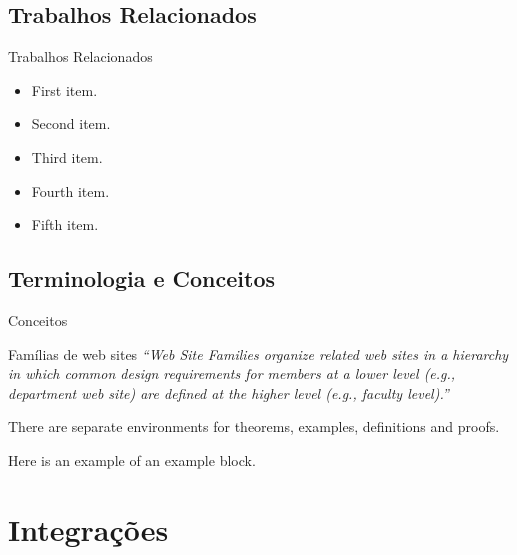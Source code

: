 \documentclass{beamer}
\begin{document}
\subsection{Trabalhos Relacionados}

\begin{frame}{Trabalhos Relacionados}
  \begin{itemize}
  \item {
    First item.
    \pause %
  }
  \item {   
    Second item.
  }
  \item<3-> {
    Third item.
  }
  \item<4-> {
    Fourth item.
  }
  \item<5-> {
    Fifth item. 
  }
  \end{itemize}
\end{frame}

\subsection{Terminologia e Conceitos}

\begin{frame}{Conceitos}
    \begin{block}{Famílias de web sites}
     \textit{``Web Site Families organize related web sites in a hierarchy in which common design requirements for members at a lower level (e.g., department web site) are defined at the higher level (e.g., faculty level).''} \cite{Eichinger2009}
    \end{block}
    \begin{theorem}
    There are separate environments for theorems, examples, definitions and proofs.
    \end{theorem}
    \begin{example}
    Here is an example of an example block.
    \end{example}
\end{frame}

\section{Integrações}
\end{document}
